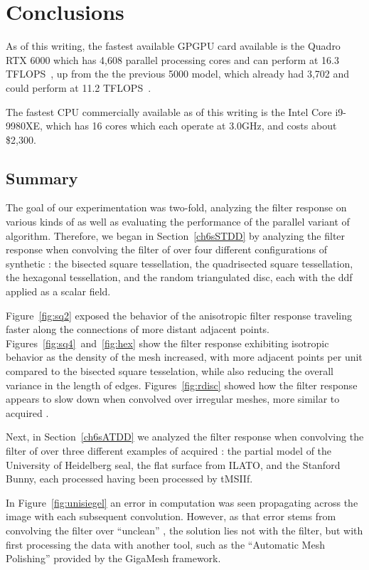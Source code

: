 \chapter{Conclusions}
As of this writing, the fastest available GPGPU card available is the Quadro RTX 6000 which has 4,608 parallel processing cores and can perform at 16.3 TFLOPS~\cite{quadro6k}, up from the the previous 5000 model, which already had 3,702 and could perform at 11.2 TFLOPS~\cite{quadro5k}.

The fastest CPU commercially available as of this writing is the Intel Core i9-9980XE, which has 16 cores which each operate at 3.0GHz, and costs about \$2,300.


%
%
%
%
%
%
\section{Summary}

The goal of our experimentation was two-fold, analyzing the filter response on various kinds of \tdd{} as well as evaluating the performance of the parallel variant of  algorithm. Therefore, we began in Section~\ref{ch6sSTDD} by analyzing the filter response when convolving the filter of over four different configurations of synthetic \tdd{}: the bisected square tessellation, the quadrisected square tessellation, the hexagonal tessellation, and the random triangulated disc, each with the \gls{ddf} applied as a scalar field.

Figure~\ref{fig:sq2} exposed the behavior of the anisotropic filter response traveling faster along the connections of more distant adjacent points. Figures~\ref{fig:sq4}~and~\ref{fig:hex} show the filter response exhibiting isotropic behavior as the density of the mesh increased, with more adjacent points per unit compared to the bisected square tesselation, while also reducing the overall variance in the length of edges. Figures~\ref{fig:rdisc} showed how the filter response appears to slow down when convolved over irregular meshes, more similar to acquired \tdd{}.

Next, in Section~\ref{ch6sATDD} we analyzed the filter response when convolving the filter of over three different examples of acquired \tdd{}: the partial model of the University of Heidelberg seal, the flat surface from ILATO, and the Stanford Bunny, each processed having been processed by \gls{tMSIIf}.

In Figure~\ref{fig:unisiegel} an error in computation was seen propagating across the image with each subsequent convolution. However, as that error stems from convolving the filter over ``unclean'' \tdd{}, the solution lies not with the filter, but with first processing the data with another tool, such as the ``Automatic Mesh Polishing'' provided by the GigaMesh framework.

